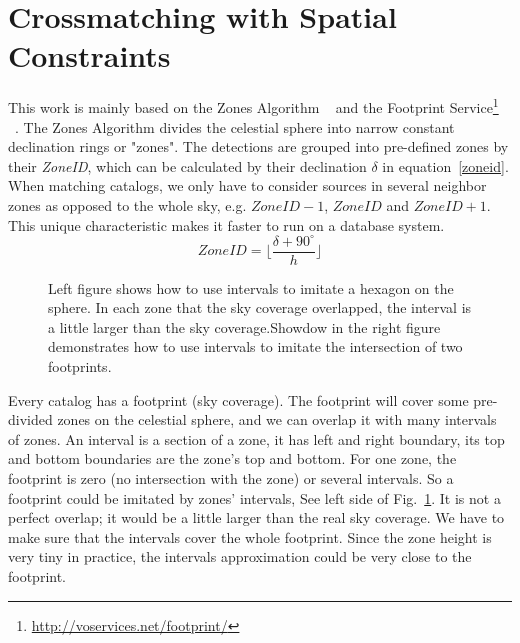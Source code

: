 \section{Crossmatching with Spatial Constraints}
This work is mainly based on the Zones Algorithm ~\citep{DBLP:journals/corr/abs-cs-0701171} and the Footprint Service\footnote{\url{http://voservices.net/footprint/}} ~\citep{2007ASPC..376..559B}. The Zones Algorithm divides the celestial sphere into narrow constant declination rings or "zones". The detections are grouped into pre-defined zones by their \textit{ZoneID}, which can be calculated by their declination $\delta$ in equation~\ref{zoneid}. When matching catalogs, we only have to consider sources in several neighbor zones as opposed to the whole sky, e.g. $ZoneID-1$, $ZoneID$ and $ZoneID+1$. This unique characteristic makes it faster to run on a database system.
\begin{equation}\label{zoneid}
ZoneID=\lfloor{\frac{\delta + 90^\circ}{h}}\rfloor
\end{equation}

\begin{figure}
\begin{center}
\caption{{Left figure shows how to use intervals to imitate a hexagon on the sphere. In each zone that the sky coverage overlapped, the interval is a little larger than the sky coverage.}{Showdow in the right figure demonstrates how to use intervals to imitate the intersection of two footprints.}\label{P046_f2}}
\end{center}
\end{figure}

Every catalog has a footprint (sky coverage). The footprint will cover some pre-divided zones on the celestial sphere, and we can overlap it with many intervals of zones. An interval is a section of a zone, it has left and right boundary, its top and bottom boundaries are the zone's top and bottom. For one zone, the footprint is zero (no intersection with the zone) or several intervals. So a footprint could be imitated by zones' intervals, See left side of Fig.~\ref{P046_f2}. It is not a perfect overlap; it would be a little larger than the real sky coverage. We have to make sure that the intervals cover the whole footprint. Since the zone height is very tiny in practice, the intervals approximation could be very close to the footprint.

